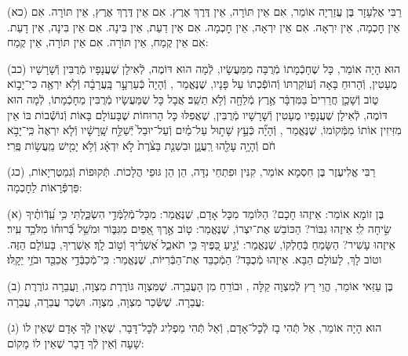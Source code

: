 \documentclass[twoside, openany, parskip=half, 11pt]{book}
\begin{document}
(כא)
רַבִּי אֶלְעָזָר בֶּן עֲזַרְיָה אוֹמֵר, אִם אֵין תּוֹרָה, אֵין דֶּרֶךְ אֶרֶץ.
אִם אֵין דֶּרֶךְ אֶרֶץ, אֵין תּוֹרָה.
אִם אֵין חׇכְמָה, אֵין יִרְאָה.
אִם אֵין יִרְאָה, אֵין חׇכְמָה.
אִם אֵין דַעַת, אֵין בִּינָה.
אִם אֵין בִּינָה, אֵין דָעַת.
אִם אֵין קֶמַח, אֵין תּוֹרָה.
אִם אֵין תּוֹרָה, אֵין קֶמַח:

(כב)
הוּא הָיָה אוֹמֵר, כָּל שֶׁחָכְֿמָתוֹ מְֿרֻבָּה מִמַּעֲשָׂיו, לְֿמָה הוּא דּוֹמֶה, לְֿאִילָן שֶׁעֲנָפָיו מְֿרֻבִּין וְֿשָׁרָשָׁיו מֻעָטִין, וְֿהָרוּחַ בָּאָה וְֿעוֹקַרְתּוֹ וְֿהוֹפְֿכְתוֹ עַל פָּנָיו, שֶׁנֶּאֱמַר , וְֿהָיָה֙ כְּֿעַרְעָ֣ר בָּֽעֲרָבָ֔ה וְֿלֹ֥א יִרְאֶ֖ה כִּי־יָב֣וֹא ט֑וֹב וְֿשָׁכַ֤ן חֲרֵרִים֙ בַּמִּדְבָּ֔ר אֶ֥רֶץ מְֿלֵחָ֖ה וְֿלֹ֥א תֵשֵֽׁב׃
אֲבָל כָּל שֶׁמַּעֲשָׂיו מְֿרֻבִּין מֵחָכְֿמָתוֹ, לְֿמָה הוּא דּוֹמֶה, לְֿאִילָן שֶׁעֲנָפָיו מֻעָטִין וְֿשָׁרָשָׁיו מְֿרֻבִּין, שֶׁאֲפִלּוּ כָּל הָרוּחוֹת שֶׁבָּעוֹלָם בָּאוֹת וְֿנוֹשְֿֿׁבוֹת בּוֹ אֵין מִזִּיזִין אוֹתוֹ מִמְּֿקוֹמוֹ, שֶׁנֶּאֱמַר , וְֿהָיָ֞ה כְּֿעֵ֣ץ שָׁת֣וּל עַל־מַ֗יִם וְֿעַל־יוּבַל֙ יְֿשַׁלַּ֣ח שָֽׁרָשָׁ֔יו וְֿלֹ֤א יִרְאֶה֙ כִּֽי־יָבֹ֣א חֹ֔ם וְֿהָיָ֥ה עָלֵ֖הוּ רַֽעֲנָ֑ן וּבִשְׁנַ֤ת בַּצֹּ֨רֶת֙ לֹ֣א יִדְאָ֔ג וְֿלֹ֥א יָמִ֖ישׁ מֵֽעֲשׂ֥וֹת פֶּֽרִי׃

(כג)
רַבִּי אֱלִיעֶזֶר בֶּן חִסְמָא אוֹמֵר, קִנִּין וּפִתְחֵי נִדָּה, הֵן הֵן גּוּפֵי הֲלָכוֹת.
תְּֿקוּפוֹת וְֿגִמַטְרְיָאוֹת, פַּרְפְּֿרָאוֹת לַחׇכְמָה:


\kolyisroel

(א)
בֶּן זוֹמָא אוֹמֵר:
אֵיזֶהוּ חָכָם? הַלּוֹמֵד מִכָּל אָדָם, שֶׁנֶּאֱמַר: מִכָּל־מְֿלַמְּֿדַ֥י הִשְׂכַּ֑לְתִּי כִּ֥י עֵֽ֝דְֿוֹתֶ֗יךָ שִׂ֣יחָה לִֽי׃
אֵיזֶהוּ גִבּוֹר? הַכּוֹבֵשׁ אֶת־יִצְרוֹ, שֶׁנֶּאֱמַר: ט֤וֹב אֶ֣רֶךְ אַ֭פַּיִם מִגִּבּ֑וֹר וּמֹשֵׁ֥ל בְּֿ֝רוּח֗וֹ מִלֹּכֵ֥ד עִֽיר׃
אֵיזֶהוּ עָשִׁיר? הַשָּׂמֵחַ בְּֿחֶלְקוֹ, שֶׁנֶּאֱמַר: יְֿגִ֣יעַ כַּ֭פֶּיךָ כִּ֥י תֹאכֵ֑ל אַ֝שְׁרֶ֗יךָ וְֿט֣וֹב לָֽךְ׃ אַשְׁרֶיךָ, בָּעוֹלָם הַזֶּה. וטוֹב לָךְ, לָעוֹלָם הַבָּא.
אֵיזֶהוּ מְֿכֻבָּד? הַמְֿכַבֵּד אֶת־הַבְּֿרִיּוֹת, שֶׁנֶּאֱמַר: כִּֽי־מְֿכַבְּֿדַ֥י אֲכַבֵּ֖ד וּבֹזַ֥י יֵקָֽלּוּ׃

(ב)
בֶּן עַזַּאי אוֹמֵר, הֱוֵי רָץ לְֿמִצְוָה קַלָּה , וּבוֹרֵחַ מִן הָעֲבֵרָה.
שֶׁמִּצְוָה גּוֹרֶרֶת מִצְוָה, וַעֲבֵרָה גוֹרֶרֶת עֲבֵרָה.
שֶׁשְּֿׂכַר מִצְוָה, מִצְוָה. וּשְׂכַר עֲבֵרָה, עֲבֵרָה:

(ג)
הוּא הָיָה אוֹמֵר, אַל תְּֿהִי בָז לְֿכׇל־אָדָם,
וְֿאַל תְּֿהִי מַפְלִיג לְֿכׇל־דָּבָר,
שֶׁאֵין לְֿךָ אָדָם שֶׁאֵין לוֹ שָׁעָה וְֿאֵין לְֿךָ דָבָר שֶׁאֵין לוֹ מָקוֹם:
\end{document}
